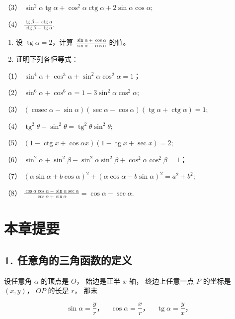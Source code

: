 （3）
\(\sin^2\alpha \operatorname{tg}\alpha +\cos^2\alpha \operatorname{ctg}\alpha +2\sin \alpha \cos \alpha ;\)

（4）
\(\frac{\operatorname{tg}\beta + \operatorname{ctg}\alpha}{\operatorname{ctg}\beta + \operatorname{tg}\alpha}\).

\begin{enumerate}[start=8]
\item
  设 \(\operatorname{tg} \alpha = 2\)，计算
  \(\frac{\sin \alpha + \cos \alpha}{\sin \alpha - \cos \alpha}\) 的值。
\item
  证明下列各恒等式：
\end{enumerate}

（1） \(\sin^4\alpha + \cos^3\alpha + \sin^2\alpha \cos^2\alpha = 1\)；

（2） \(\sin^6\alpha + \cos^6\alpha = 1 - 3\sin^2\alpha \cos^2\alpha;\)

（3）
\((\operatorname{cosec} \alpha - \sin \alpha)(\sec \alpha - \cos \alpha)(\operatorname{tg} \alpha + \operatorname{ctg} \alpha) = 1;\)

（4）
\(\operatorname{tg}^2\theta - \sin^2\theta = \operatorname{tg}^2\theta \sin^2\theta;\)

（5）
\((1 - \operatorname{ctg} x + \cos \alpha x)(1 - \operatorname{tg} x + \sec x) = 2;\)

（6）
\(\sin^2\alpha + \sin^2\beta - \sin^2\alpha \sin^2\beta + \cos^2\alpha \cos^2\beta = 1\)；

（7）
\((\alpha \sin \alpha + b \cos \alpha)^2 + (\alpha \cos \alpha - b \sin \alpha)^2 = a^2 + b^2;\)

（8）
\(\frac{\cos\alpha\cos\alpha-\sin\alpha\sec\alpha}{\cos\alpha+\sin\alpha}=\cos\alpha-\sec\alpha.\)

\section{本章提要}

\subsection{1. 任意角的三角函数的定义}

设任意角 \(\alpha\) 的顶点是 \(O\)， 始边是正半 \(x\) 轴，
终边上任意一点 \(P\) 的坐标是 \((x, y)\)， \(OP\) 的长是 \(r\)， 那末

\[
\sin \alpha = \frac {y}{r}\text{，} \quad \cos \alpha = \frac {x}{r}\text{，} \quad \operatorname{tg} \alpha = \frac {y}{x}\text{，}
\]

